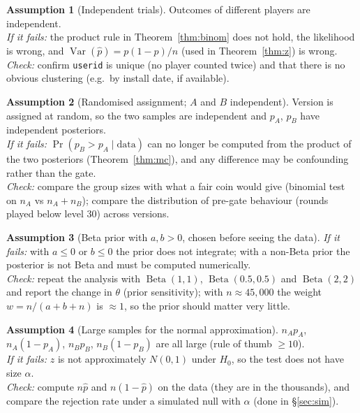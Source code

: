 \documentclass[11pt]{article}
\theoremstyle{definition}
\newtheorem{assumption}{Assumption}
\theoremstyle{remark}
\renewcommand{\Pr}{\operatorname{Pr}}
\newcommand{\Var}{\operatorname{Var}}
\newcommand{\Betad}{\operatorname{Beta}}
\newcommand{\data}{\text{data}}
\begin{document}
\begin{assumption}[Independent trials]\label{as:indep}
Outcomes of different players are independent.\\
\emph{If it fails:} the product rule in Theorem~\ref{thm:binom} does not hold, the likelihood is wrong,
and $\Var(\hat p)=p(1-p)/n$ (used in Theorem~\ref{thm:z}) is wrong.\\
\emph{Check:} confirm \texttt{userid} is unique (no player counted twice) and that there is no
obvious clustering (e.g.\ by install date, if available).
\end{assumption}

\begin{assumption}[Randomised assignment; $A$ and $B$ independent]\label{as:random}
Version is assigned at random, so the two samples are independent and $p_A$, $p_B$ have independent
posteriors.\\
\emph{If it fails:} $\Pr(p_B>p_A\mid\data)$ can no longer be computed from the product of the two
posteriors (Theorem~\ref{thm:mc}), and any difference may be confounding rather than the gate.\\
\emph{Check:} compare the group sizes with what a fair coin would give (binomial test on $n_A$ vs
$n_A+n_B$); compare the distribution of pre-gate behaviour (rounds played below level 30) across versions.
\end{assumption}

\begin{assumption}[Beta prior with $a,b>0$, chosen before seeing the data]\label{as:prior}
\emph{If it fails:} with $a\le0$ or $b\le0$ the prior does not integrate; with a non-Beta prior the
posterior is not Beta and must be computed numerically.\\
\emph{Check:} repeat the analysis with $\Betad(1,1)$, $\Betad(0.5,0.5)$ and $\Betad(2,2)$ and report the
change in $\theta$ (prior sensitivity); with $n\approx45{,}000$ the weight $w=n/(a+b+n)$ is $\approx1$, so the
prior should matter very little.
\end{assumption}

\begin{assumption}[Large samples for the normal approximation]\label{as:clt}
$n_Ap_A$, $n_A(1-p_A)$, $n_Bp_B$, $n_B(1-p_B)$ are all large (rule of thumb $\ge10$).\\
\emph{If it fails:} $z$ is not approximately $N(0,1)$ under $H_0$, so the test does not have size $\alpha$.\\
\emph{Check:} compute $n\hat p$ and $n(1-\hat p)$ on the data (they are in the thousands), and
compare the rejection rate under a simulated null with $\alpha$ (done in \S\ref{sec:sim}).
\end{assumption}
\end{document}

